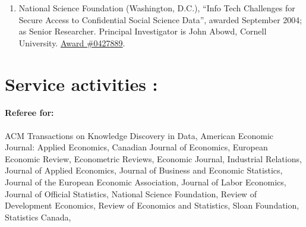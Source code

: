 \documentclass[12pt,letterpaper]{report}
\begin{document}
\begin{enumerate}
\item National Science Foundation (Washington, D.C.),  ``Info
  Tech Challenges for Secure Access to Confidential Social Science Data'',
  awarded September 2004; as Senior Researcher. Principal Investigator is John Abowd, Cornell
  University.   \href{http://www.nsf.gov/awardsearch/showAward.do?AwardNumber=0427889}{Award \#0427889}.
\end{enumerate}

\section*{ Service activities :}%
\paragraph{ Referee for:}
  ACM   Transactions on Knowledge Discovery in Data, 
  American Economic Journal: Applied Economics,
  Canadian Journal of Economics, 
  European Economic Review,  
  Econometric Reviews, 
  Economic Journal,  
  Industrial Relations, 
  Journal of Applied Economics, 
  Journal of Business and Economic Statistics,  
  Journal of the European Economic Association,
  Journal of Labor   Economics, 
  Journal of Official Statistics,
  National Science Foundation,
  Review of Development Economics, 
  Review of Economics and Statistics,
  Sloan Foundation,
  Statistics Canada,
\end{document}
